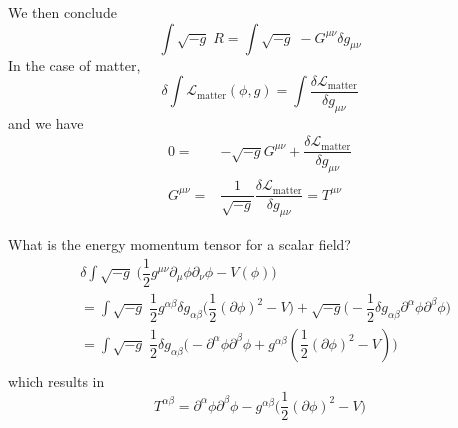 \vspace{2ex}
We then conclude
\[\int \sqrt{-g}\;R=\int\sqrt{-g}\; -G^{\mu \nu }\delta g_{\mu \nu }\]
In the case of matter,
\[\delta \int \mathcal{L}_{\mathrm{matter}}(\phi ,g)=\int \dfrac{\delta \mathcal{L}_{\mathrm{matter}}}{\delta g_{\mu \nu }}\]
and we have
\begin{align*}
	0=&-\sqrt{-g}G^{\mu \nu }+\dfrac{\delta \mathcal{L}_{\mathrm{matter}}}{\delta g_{\mu \nu }} \\
	G^{\mu \nu }=& \dfrac{1}{\sqrt{-g}}\dfrac{\delta \mathcal{L}_{\mathrm{matter}}}{\delta g_{\mu \nu }}=T^{\mu \nu }
\end{align*}
\begin{ex}
What is the energy momentum tensor for a scalar field?
\begin{align*}
&\delta \int \sqrt{-g}\;\Big(\dfrac{1}{2}g^{\mu \nu }\partial _{\mu }\phi \partial _{\nu }\phi -V(\phi )\Big)\\
&=\int\sqrt{-g}\; \dfrac{1}{2}g^{\alpha \beta }\delta g_{\alpha \beta }\Big(\dfrac{1}{2}(\partial \phi )^2-V\Big)+\sqrt{-g}\Big(-\dfrac{1}{2}\delta g_{\alpha \beta }\partial ^{\alpha }\phi \partial ^{\beta }\phi \Big)\\
&=\int \sqrt{-g}\;\dfrac{1}{2}\delta g_{\alpha \beta }\Big(-\partial ^{\alpha }\phi \partial ^{\beta }\phi +g^{\alpha \beta }(\dfrac{1}{2}(\partial \phi )^2-V)\Big)\\
\end{align*}
which results in 
\[T^{\alpha \beta }=\partial ^{\alpha }\phi \partial ^{\beta }\phi -g^{\alpha \beta }\Big(\dfrac{1}{2}(\partial \phi )^2-V\Big)\]
\end{ex}
\vspace{2ex}
